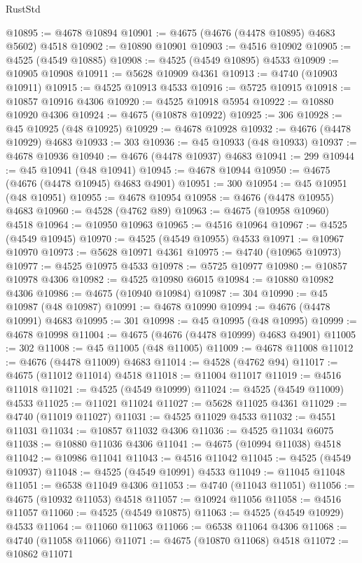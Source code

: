 \begin{lexlean}{RustStd}
\begin{coremodule}
@10895 := @4678 @10894
@10901 := @4675 (@4676 (@4478 @10895) @4683 @5602) @4518
@10902 := @10890 @10901
@10903 := @4516 @10902
@10905 := @4525 (@4549 @10885)
@10908 := @4525 (@4549 @10895) @4533
@10909 := @10905 @10908
@10911 := @5628 @10909 @4361
@10913 := @4740 (@10903 @10911)
@10915 := @4525 @10913 @4533
@10916 := @5725 @10915
@10918 := @10857 @10916 @4306
@10920 := @4525 @10918 @5954
@10922 := @10880 @10920 @4306
@10924 := @4675 (@10878 @10922)
@10925 := 306
@10928 := @45 @10925 (@48 @10925)
@10929 := @4678 @10928
@10932 := @4676 (@4478 @10929) @4683
@10933 := 303
@10936 := @45 @10933 (@48 @10933)
@10937 := @4678 @10936
@10940 := @4676 (@4478 @10937) @4683
@10941 := 299
@10944 := @45 @10941 (@48 @10941)
@10945 := @4678 @10944
@10950 := @4675 (@4676 (@4478 @10945) @4683 @4901)
@10951 := 300
@10954 := @45 @10951 (@48 @10951)
@10955 := @4678 @10954
@10958 := @4676 (@4478 @10955) @4683
@10960 := @4528 (@4762 @89)
@10963 := @4675 (@10958 @10960) @4518
@10964 := @10950 @10963
@10965 := @4516 @10964
@10967 := @4525 (@4549 @10945)
@10970 := @4525 (@4549 @10955) @4533
@10971 := @10967 @10970
@10973 := @5628 @10971 @4361
@10975 := @4740 (@10965 @10973)
@10977 := @4525 @10975 @4533
@10978 := @5725 @10977
@10980 := @10857 @10978 @4306
@10982 := @4525 @10980 @6015
@10984 := @10880 @10982 @4306
@10986 := @4675 (@10940 @10984)
@10987 := 304
@10990 := @45 @10987 (@48 @10987)
@10991 := @4678 @10990
@10994 := @4676 (@4478 @10991) @4683
@10995 := 301
@10998 := @45 @10995 (@48 @10995)
@10999 := @4678 @10998
@11004 := @4675 (@4676 (@4478 @10999) @4683 @4901)
@11005 := 302
@11008 := @45 @11005 (@48 @11005)
@11009 := @4678 @11008
@11012 := @4676 (@4478 @11009) @4683
@11014 := @4528 (@4762 @94)
@11017 := @4675 (@11012 @11014) @4518
@11018 := @11004 @11017
@11019 := @4516 @11018
@11021 := @4525 (@4549 @10999)
@11024 := @4525 (@4549 @11009) @4533
@11025 := @11021 @11024
@11027 := @5628 @11025 @4361
@11029 := @4740 (@11019 @11027)
@11031 := @4525 @11029 @4533
@11032 := @4551 @11031
@11034 := @10857 @11032 @4306
@11036 := @4525 @11034 @6075
@11038 := @10880 @11036 @4306
@11041 := @4675 (@10994 @11038) @4518
@11042 := @10986 @11041
@11043 := @4516 @11042
@11045 := @4525 (@4549 @10937)
@11048 := @4525 (@4549 @10991) @4533
@11049 := @11045 @11048
@11051 := @6538 @11049 @4306
@11053 := @4740 (@11043 @11051)
@11056 := @4675 (@10932 @11053) @4518
@11057 := @10924 @11056
@11058 := @4516 @11057
@11060 := @4525 (@4549 @10875)
@11063 := @4525 (@4549 @10929) @4533
@11064 := @11060 @11063
@11066 := @6538 @11064 @4306
@11068 := @4740 (@11058 @11066)
@11071 := @4675 (@10870 @11068) @4518
@11072 := @10862 @11071

\end{coremodule}
\end{lexlean}

